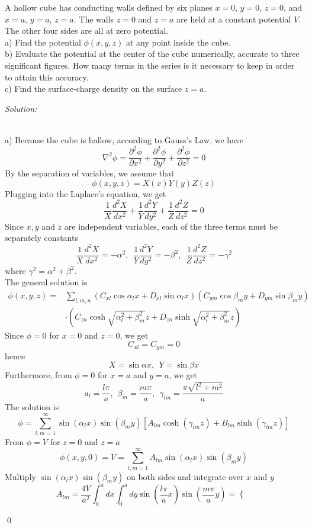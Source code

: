 \documentclass[12pt]{article}
\newenvironment{problem}[2][Problem]{\begin{trivlist}
\item[\hskip \labelsep {\bfseries #1}\hskip \labelsep {\bfseries #2.}]}{\end{trivlist}}
\newenvironment{sol}
    {\emph{Solution:}
    }
    {
    \qed
    }
\begin{document}
\begin{problem}{1}
A hollow cube has conducting walls defined by six planes $x=0$, $y=0$, $z=0$, and $x=a$, $y=a$, $z=a$. The walls $z=0$ and $z=a$ are held at a constant potential $V$. The other four sides are all at zero potential.\\
a) Find the potential $\phi(x,y,z)$ at any point inside the cube.\\
b) Evaluate the potential at the center of the cube numerically, accurate to three significant figures. How many terms in the series is it necessary to keep in order to attain this accuracy.\\
c) Find the surface-charge density on the surface $z=a$.
\end{problem}
\begin{sol}
\\a) Because the cube is hallow, according to Gauss's Law, we have
\[
\nabla^2\phi=\frac{\partial^2\phi}{\partial x^2}+\frac{\partial^2\phi}{\partial y^2}+\frac{\partial^2\phi}{\partial z^2}=0
\]
By the separation of variables, we assume that
\[
\phi(x,y,z)=X(x)Y(y)Z(z)
\]
Plugging into the Laplace’s equation, we get
\[
\frac{1}{X}\frac{d^2X}{dx^2}+\frac{1}{Y}\frac{d^2Y}{dy^2}+\frac{1}{Z}\frac{d^2Z}{dz^2}=0
\]
Since $x, y$ and $z$ are independent variables, each of the three terms must be separately constants
\[
\frac{1}{X}\frac{d^2X}{dx^2}=-\alpha^2,~~\frac{1}{Y}\frac{d^2Y}{dy^2}=-\beta^2,~~\frac{1}{Z}\frac{d^2Z}{dz^2}=-\gamma^2
\]
where $\gamma^2=\alpha^2+\beta^2$.\\
The general solution is
\begin{align*}
\phi(x,y,z)=&\sum_{l,m,n}(C_{xl}\cos\alpha_lx+D_{xl}\sin\alpha_lx)(C_{ym}\cos\beta_my+D_{ym}\sin\beta_my)\\
&\cdot(C_{zn}\cosh\sqrt{\alpha_l^2+\beta_m^2}z+D_{zn}\sinh\sqrt{\alpha_l^2+\beta_m^2}z)
\end{align*}
Since $\phi=0$ for $x=0$ and $z=0$, we get
\[
C_{xl}=C_{ym}=0
\]
hence
\[
X=\sin\alpha x,~~Y=\sin\beta x
\]
Furthermore, from $\phi=0$ for $x=a$ and $y=a$, we get
\[
a_l=\frac{l\pi}{a},~~\beta_m=\frac{m\pi}{a},~~\gamma_{lm}=\frac{\pi\sqrt{l^2+m^2}}{a}
\]
The solution is
\[
\phi=\sum_{l,m=1}^{\infty}\sin(\alpha_lx)\sin(\beta_my)[A_{lm}\cosh(\gamma_{lm}z)+B_{lm}\sinh(\gamma_{lm}z)]
\]
From $\phi=V$ for $z=0$ and $z=a$
\[
\phi(x,y,0)=V=\sum_{l,m=1}^{\infty}A_{lm}\sin(\alpha_lx)\sin(\beta_my)
\]
Multiply $\sin(\alpha_lx)\sin(\beta_my)$ on both sides and integrate over $x$ and $y$
\[
A_{lm}=\frac{4V}{a^2}\int_0^adx\int_0^ady\sin(\frac{l\pi}{a}x)\sin(\frac{m\pi}{a}y)=\left\{\begin{array}{ll}

\end{array}\]
\end{sol}
\end{document}
